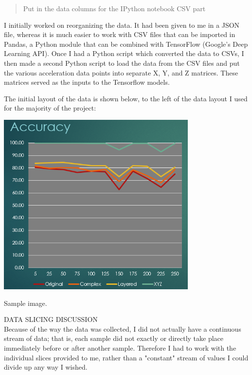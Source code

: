 \documentclass[]{report}
\begin{document}
\begin{quote}
Put in the data columns for the IPython notebook CSV part
\end{quote}

I initially worked on reorganizing the data. It had been given to me in a JSON file, whereas it is much easier to work with CSV files that can be imported in Pandas, a Python module that can be combined with TensorFlow (Google's Deep Learning API). Once I had a Python script which converted the data to CSVs, I then made a second Python script to load the data from the CSV files and put the various acceleration data points into separate X, Y, and Z matrices. These matrices served as the inputs to the Tensorflow models.

The initial layout of the data is shown below, to the left of the data layout I used for the majority of the project:\\
\begin{minipage}{\linewidth}
	\begin{minipage}{0.49\textwidth}
		\centering
		\includegraphics[width=0.75\textwidth]{../images/accuracy}
	\end{minipage}
	\hfill
	
	\begin{minipage}{0.49\textwidth}
		\centering
		Sample image.
	\end{minipage}
\end{minipage}

DATA SLICING DISCUSSION\\
Because of the way the data was collected, I did not actually have a continuous stream of data; that is, each sample did not exactly or directly take place immediately before or after another sample. Therefore I had to work with the individual slices provided to me, rather than a "constant" stream of values I could divide up any way I wished.
\end{document}

